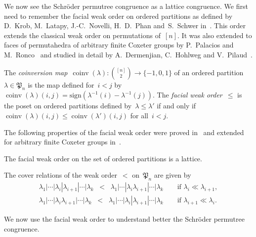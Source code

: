 \documentclass[ALCO]{cedram}
\newcommand{\fP}{\mathfrak{P}} %
\newcommand{\sep}{|} %
\newcommand{\sign}{\mathrm{sign}} %
\DeclareMathOperator{\coinv}{coinv} %
\newcommand{\darkblue}{\color{darkblue}} %
\newcommand{\defn}[1]{\emph{\darkblue #1}} %
\begin{document}
We now see the Schr\"oder permutree congruence as a lattice congruence. We first need to remember the facial weak order on ordered partitions as defined by D.~Krob, M.~Latapy, \mbox{J.-C.~Novelli}, H.~D.~Phan and~S.~Schwer in~\cite{KrobLatapyNovelliPhanSchwer}. This order extends the classical weak order on permutations of~$[n]$. It was also extended to faces of permutahedra of arbitrary finite Coxeter groups by P.~Palacios and M.~Ronco~\cite{PalaciosRonco} and studied in detail by A.~Dermenjian, C.~Hohlweg and V.~Pilaud~\cite{DermenjianHohlwegPilaud}.

\begin{definition}
The \defn{coinversion map}~${\coinv(\lambda) : \binom{[n]}{2} \to \{-1,0,1\}}$ of an ordered partition~$\lambda \in \fP_n$ is the map defined for~$i < j$ by~$\coinv(\lambda)(i,j) = \sign(\lambda^{-1}(i) - \lambda^{-1}(j))$. The \defn{facial weak order}~$\le$ is the poset on ordered partitions defined by~$\lambda \le \lambda'$ if and only if~$\coinv(\lambda)(i,j) \le \coinv(\lambda')(i,j)$ for all~$i < j$.
\end{definition}

The following properties of the facial weak order were proved in~\cite{KrobLatapyNovelliPhanSchwer} and extended for arbitrary finite Coxeter groups in~\cite{DermenjianHohlwegPilaud}.

\begin{proposition}
The facial weak order on the set of ordered partitions is a lattice.
\end{proposition}

\begin{proposition}
The cover relations of the weak order~$<$ on~$\fP_n$ are given by
\begin{gather*}
\lambda_1 \sep \cdots \sep \lambda_i \sep \lambda_{i+1} \sep \cdots \sep \lambda_k \;\; < \;\; \lambda_1 \sep \cdots \sep \lambda_i\lambda_{i+1} \sep \cdots \sep \lambda_k \qquad\text{if } \lambda_i \ll \lambda_{i+1}, \\
\lambda_1 \sep \cdots \sep \lambda_i\lambda_{i+1} \sep \cdots \sep \lambda_k \;\; < \;\; \lambda_1 \sep \cdots \sep \lambda_i \sep \lambda_{i+1} \sep \cdots \sep \lambda_k \qquad\text{if } \lambda_{i+1} \ll \lambda_i.
\end{gather*}
\end{proposition}

We now use the facial weak order to understand better the Schr\"oder permutree congruence.
\end{document}
